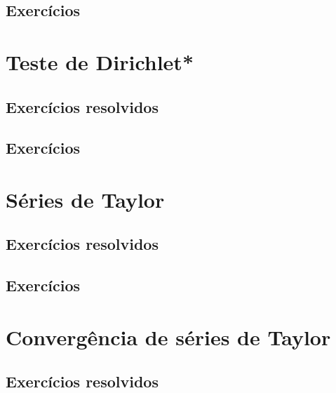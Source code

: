 \subsection*{Exercícios}

\construirExer


\section{Teste de Dirichlet*}
\construirSec

\subsection*{Exercícios resolvidos}

\construirExeresol


\subsection*{Exercícios}

\construirExer


\section{Séries de Taylor}
\construirSec

\subsection*{Exercícios resolvidos}

\construirExeresol


\subsection*{Exercícios}

\construirExer


\section{Convergência de séries de Taylor}
\construirSec

\subsection*{Exercícios resolvidos}

